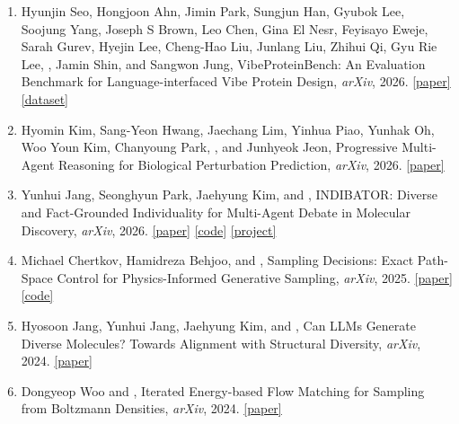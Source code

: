 \begin{enumerate}
\item Hyunjin Seo, Hongjoon Ahn, Jimin Park, Sungjun Han, Gyubok Lee, Soojung Yang, Joseph S Brown, Leo Chen, Gina El Nesr, Feyisayo Eweje, Sarah Gurev, Hyejin Lee, Cheng-Hao Liu, Junlang Liu, Zhihui Qi, Gyu Rie Lee, , Jamin Shin, and Sangwon Jung, VibeProteinBench: An Evaluation Benchmark for Language-interfaced Vibe Protein Design, \textit{arXiv}, 2026. \mbox{\href{https://arxiv.org/abs/2605.10978}{[paper]}} \mbox{\href{https://huggingface.co/datasets/vibepdbench/VibeProteinBench}{[dataset]}}
\item Hyomin Kim, Sang-Yeon Hwang, Jaechang Lim, Yinhua Piao, Yunhak Oh, Woo Youn Kim, Chanyoung Park, , and Junhyeok Jeon, Progressive Multi-Agent Reasoning for Biological Perturbation Prediction, \textit{arXiv}, 2026. \mbox{\href{https://arxiv.org/abs/2602.07408}{[paper]}}
\item Yunhui Jang, Seonghyun Park, Jaehyung Kim, and , INDIBATOR: Diverse and Fact-Grounded Individuality for Multi-Agent Debate in Molecular Discovery, \textit{arXiv}, 2026. \mbox{\href{https://arxiv.org/abs/2602.01815}{[paper]}} \mbox{\href{https://github.com/yunhuijang/INDIBATOR}{[code]}} \mbox{\href{https://yunhuijang.github.io/projects/INDIBATOR/}{[project]}}
\item Michael Chertkov, Hamidreza Behjoo, and , Sampling Decisions: Exact Path-Space Control for Physics-Informed Generative Sampling, \textit{arXiv}, 2025. \mbox{\href{https://arxiv.org/abs/2503.14549}{[paper]}} \mbox{\href{https://github.com/hamidrezabehjoo/SamplingDecisions}{[code]}}
\item Hyosoon Jang, Yunhui Jang, Jaehyung Kim, and , Can LLMs Generate Diverse Molecules? Towards Alignment with Structural Diversity, \textit{arXiv}, 2024. \mbox{\href{https://arxiv.org/abs/2410.03138}{[paper]}}
\item Dongyeop Woo and , Iterated Energy-based Flow Matching for Sampling from Boltzmann Densities, \textit{arXiv}, 2024. \mbox{\href{https://arxiv.org/abs/2408.16249}{[paper]}}
\end{enumerate}
